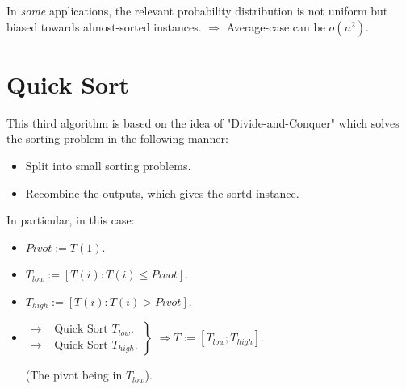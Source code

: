 In \emph{some} applications, the relevant probability distribution is not uniform but biased towards almost-sorted instances.   \newline $\Rightarrow$ Average-case can be $o(n^2)$. 

\section{Quick Sort}
This third algorithm is based on the idea of "Divide-and-Conquer" which solves the sorting problem in the following manner:

\begin{itemize}
\renewcommand{\labelitemi}{$\bullet$}
	\item Split into small sorting problems.
	\item Recombine the outputs, which gives the sortd instance.
\end{itemize}

In particular, in this case:

\begin{itemize}
\renewcommand{\labelitemi}{$\bullet$}
	\item $Pivot:=T(1)$.
	\item $T_{low}:= [T(i): T(i)\leq Pivot]$.
	\item $T_{high}:= [T(i): T(i)>Pivot]$.
	\item $\left.
	\begin{array}{ll}
       \rightarrow & \text{ Quick Sort $T_{low}$}.\\
       \rightarrow &\text{ Quick Sort $T_{high}$}.
			\end{array}
  \right\}$ $\Rightarrow T := [T_{low}; T_{high}]$.
  
	(The pivot being in $T_{low}$).
\end{itemize}


